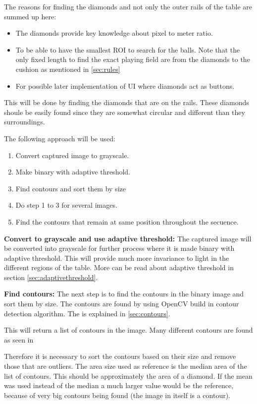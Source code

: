 The reasons for finding the diamonds and not only the outer rails of the table are summed up here:

\begin{itemize}
	\item The diamonds provide key knowledge about pixel to meter ratio.
	\item To be able to have the smallest ROI to search for the balls. Note that the only fixed length to find the exact playing field are from the diamonds to the cushion as mentioned in \ref{sec:rules}
	\item For possible later implementation of UI where diamonds act as buttons.
\end{itemize}

This will be done by finding the diamonds that are on the rails. These diamonds shoule be easily found since they are somewhat circular and different than they surroundings. 

The following approach will be used:
\begin{enumerate}
\item Convert captured image to grayscale.
\item Make binary with adaptive threshold.
\item Find contours and sort them by size
\item Do step 1 to 3 for several images.
\item Find the contours that remain at same position throughout the secuence.
\end{enumerate}

\textbf{Convert to grayscale and use adaptive threshold:}
The captured image will be converted into grayscale for further process where it is made binary with adaptive threshold. This will provide much more invariance to light in the different regions of the table. More can be read about adaptive threshold in section \ref{sec:adaptivethreshold}.

\textbf{Find contours:}
The next step is to find the contours in the binary image and sort them by size. The contours are found by using OpenCV build in contour detection algorithm. The is explained in \ref{sec:contours}.

This will return a list of contours in the image. Many different contours are found as seen in %

Therefore it is necessary to sort the contours based on their size and remove those that are outliers. The area size used as reference is the median area of the list of contours. This should be approximately the area of a diamond. If the mean was used instead of the median a much larger value would be the reference, because of very big contours being found (the image in itself is a contour).

